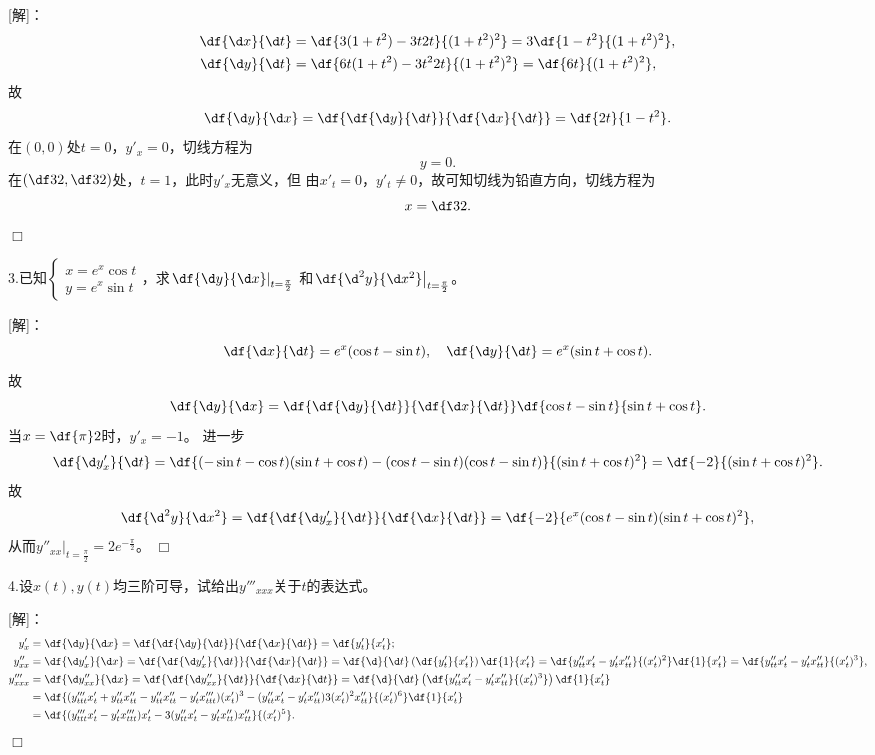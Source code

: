 [解]：
\begin{align*}
	\df{\d x}{\d t}&=\df{3(1+t^2)-3t2t}{(1+t^2)^2}=3\df{1-t^2}{(1+t^2)^2},\\
	\df{\d y}{\d t}&=\df{6t(1+t^2)-3t^22t}{(1+t^2)^2}
	=\df{6t}{(1+t^2)^2},
\end{align*}
故
$$\df{\d y}{\d x}=\df{\df{\d y}{\d t}}{\df{\d x}{\d t}}
=\df{2t}{1-t^2}.$$
在$(0,0)$处$t=0$，$y'_x=0$，切线方程为
$$y=0.$$
在$\left(\df32,\df32\right)$处，$t=1$，此时$y'_x$无意义，但
由$x'_t=0$，$y'_t\ne 0$，故可知切线为铅直方向，切线方程为
$$x=\df32.$$
\hfill$\Box$

\bigskip

3.已知$\left\{\begin{array}{l}
  	x=e^x\cos t\\ y=e^x\sin t
\end{array}\right.$，求$\left.\df{\d y}{\d x}\right|_{t=\frac{\pi}2}$
和$\left.\df{\d^2 y}{\d x^2}\right|_{t=\frac{\pi}2}$。

[解]：
$$\df{\d x}{\d t}=e^x(\cos t-\sin t),\quad
\df{\d y}{\d t}=e^x(\sin t+\cos t).$$
故
$$\df{\d y}{\d x}=\df{\df{\d y}{\d t}}{\df{\d x}{\d t}}
\df{\cos t-\sin t}{\sin t+\cos t}.$$
当$x=\df{\pi}2$时，$y'_x=-1$。
进一步
$$\df{\d y'_x}{\d t}=\df{(-\sin t-\cos t)(\sin t+\cos t)
-(\cos t-\sin t)(\cos t-\sin t)}{(\sin t+\cos t)^2}
=\df{-2}{(\sin t+\cos t)^2}.$$
故
$$\df{\d^2 y}{\d x^2}
=\df{\df{\d y'_x}{\d t}}{\df{\d x}{\d t}}
=\df{-2}{e^x(\cos t-\sin t)(\sin t+\cos t)^2},$$
从而$y''_{xx}|_{t=\frac{\pi}2}=2e^{-\frac{\pi}2}$。
\hfill$\Box$

\bigskip

4.设$x(t),y(t)$均三阶可导，试给出$y'''_{xxx}$关于$t$的表达式。

[解]：
\begin{align*}
	y'_x&=\df{\d y}{\d x}=\df{\df{\d y}{\d t}}{\df{\d x}{\d t}}
	=\df{y'_t}{x'_t};\\
	y''_{xx}&=\df{\d y'_x}{\d x}=\df{\df{\d y'_x}{\d t}}{\df{\d x}{\d t}}
	=\df{\d }{\d t}\left(\df{y'_t}{x'_t}\right)\df{1}{x'_t}
	=\df{y''_{tt}x'_t-y'_tx''_{tt}}{(x'_t)^2}\df{1}{x'_t}
	=\df{y''_{tt}x'_t-y'_tx''_{tt}}{(x'_t)^3},\\
	y'''_{xxx}&=\df{\d y''_{xx}}{\d x}=\df{\df{\d y''_{xx}}{\d t}}{\df{\d x}{\d t}}
	=\df{\d }{\d t}\left(\df{y''_{tt}x'_t-y'_tx''_{tt}}{(x'_t)^3}\right)
	\df{1}{x'_t}\\
	&=\df{(y'''_{ttt}x'_t+y''_{tt}x''_{tt}
	-y''_{tt}x''_{tt}-y'_tx'''_{ttt})(x'_t)^3
	-(y''_{tt}x'_t-y'_tx''_{tt})3(x'_t)^2x''_{tt}}{(x'_t)^6}\df{1}{x'_t}\\
	&=\df{(y'''_{ttt}x'_t-y'_tx'''_{ttt})x'_t
	-3(y''_{tt}x'_t-y'_tx''_{tt})x''_{tt}}{(x'_t)^5}.
\end{align*}
\hfill$\Box$

